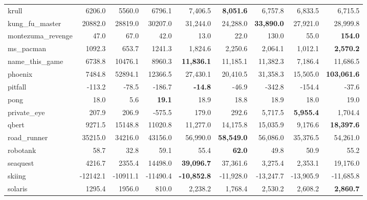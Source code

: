 \documentclass[letterpaper]{article} \usepackage{aaai18}  \usepackage{times}  \usepackage{helvet}  \usepackage{courier}  \usepackage{url}  \usepackage{graphicx}  \usepackage{amsmath,amssymb}
\begin{document}
\begin{table*}[t]
{\begin{tabular}{l|rrrrrrrr}
             krull &    6206.0 &    5560.0 &    6796.1 &     7,406.5 &  {\bf   8,051.6 }&        6,757.8 &    6,833.5 &    6,715.5 \\
    kung\_fu\_master &   20882.0 &   28819.0 &   30207.0 &    31,244.0 &   24,288.0 &     {\bf   33,890.0 }&   27,921.0 &   28,999.8 \\
 montezuma\_revenge &      47.0 &      67.0 &      42.0 &        13.0 &       22.0 &          130.0 &       55.0 &    {\bf   154.0 }\\
         ms\_pacman &    1092.3 &     653.7 &    1241.3 &     1,824.6 &    2,250.6 &        2,064.1 &    1,012.1 &   {\bf  2,570.2 }\\
    name\_this\_game &    6738.8 &   10476.1 &    8960.3 &   {\bf  11,836.1} &   11,185.1 &       11,382.3 &    7,186.4 &   11,686.5 \\
           phoenix &    7484.8 &   52894.1 &   12366.5 &    27,430.1 &   20,410.5 &       31,358.3 &   15,505.0 &  {\bf 103,061.6 }\\
           pitfall &    -113.2 &     -78.5 &    -186.7 &     {\bf   -14.8} &      -46.9 &         -342.8 &     -154.4 &      -37.6 \\
              pong &      18.0 &       5.6 &     {\bf  19.1} &        18.9 &       18.8 &           18.9 &       18.0 &       19.0 \\
       private\_eye &     207.9 &     206.9 &    -575.5 &       179.0 &      292.6 &        5,717.5 &   {\bf  5,955.4} &    1,704.4 \\
             qbert &    9271.5 &   15148.8 &   11020.8 &    11,277.0 &   14,175.8 &       15,035.9 &    9,176.6 &  {\bf  18,397.6 }\\
       road\_runner &   35215.0 &   34216.0 &   43156.0 &    56,990.0 &  {\bf  58,549.0 }&       56,086.0 &   35,376.5 &   54,261.0 \\
          robotank &      58.7 &      32.8 &      59.1 &        55.4 &      {\bf  62.0 }&           49.8 &       50.9 &       55.2 \\
          seaquest &    4216.7 &    2355.4 &   14498.0 &   {\bf  39,096.7} &   37,361.6 &        3,275.4 &    2,353.1 &   19,176.0 \\
            skiing &  -12142.1 &  -10911.1 &  -11490.4 &  {\bf  -10,852.8} &  -11,928.0 &      -13,247.7 &  -13,905.9 &  -11,685.8 \\
           solaris &    1295.4 &    1956.0 &     810.0 &     2,238.2 &    1,768.4 &        2,530.2 &    2,608.2 &    {\bf 2,860.7} \\

\end{tabular}}
\end{table*}
\end{document}
